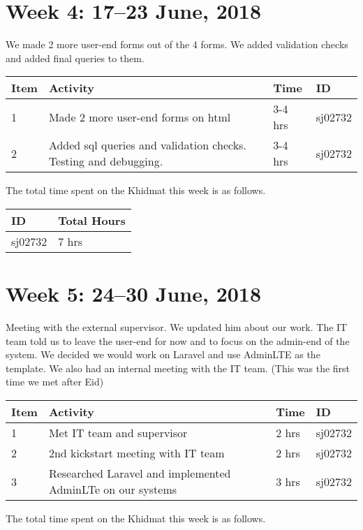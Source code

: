 \documentclass{article}
\begin{document}
\newpage %
\section*{Week 4: 17--23 June, 2018}

We made 2 more user-end forms out of the 4 forms. We added validation checks and added final queries to them.  \newline

\begin{tabular}{|l|l|l|l|}
  \hline
  Item 	& Activity & Time & ID \\\hline\hline
  1	& Made 2 more user-end forms on html & 3-4 hrs & sj02732 \\\hline
  2	& Added sql queries and validation checks. Testing and debugging. & 3-4 hrs & sj02732 \\\hline
\end{tabular}
\newline
The total time spent on the Khidmat this week is as follows.

\begin{tabular}{|l|l|}
  \hline
  ID & Total Hours\\\hline\hline
  sj02732 & 7 hrs\\\hline
\end{tabular}

\newpage %
\section*{Week 5: 24--30 June, 2018}

Meeting with the external supervisor. We updated him about our work. The IT team told us to leave the user-end for now and to focus on the admin-end of the system. We decided we would work on Laravel and use AdminLTE as the template. We also had an internal meeting with the IT team. (This was the first time we met after Eid) \newline

\begin{tabular}{|l|l|l|l|}
  \hline
  Item 	& Activity & Time & ID \\\hline\hline
  1	& Met IT team and supervisor & 2 hrs & sj02732 \\\hline
  2	& 2nd kickstart meeting with IT team & 2 hrs & sj02732 \\\hline
  3	& Researched Laravel and implemented AdminLTe on our systems & 3 hrs & sj02732 \\\hline
\end{tabular}
\newline
The total time spent on the Khidmat this week is as follows.
\end{document}
